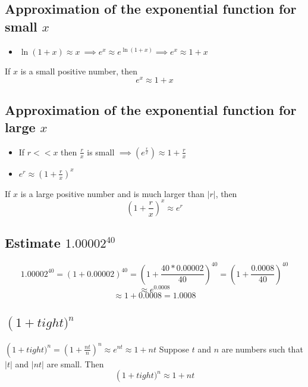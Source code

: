 \subsection{Approximation of the exponential function for small \(x\)}
\begin{itemize}
  \item \(\ln(1+x) \approx x\ \implies e^{x} \approx e^{\ln(1+x)}  \implies e^{x} \approx 1 + x\)
\end{itemize}
If \(x\) is a small positive number, then
\[ e^{x} \approx 1 + x \]

\subsection{Approximation of the exponential function for large \(x\)}
\begin{itemize}
  \item If \(r << x\) then \(\frac{r}{x}\) is small \(\implies \left( e^{\frac{r}{x}}\right) \approx 1 + \frac{r}{x}\)
  \item \(e^{r} \approx \left(1+\frac{r}{x}\right)^{x} \)
\end{itemize}
If \(x\) is a large positive number and is much larger than \(|r|\), then
\[ \left(1+\frac{r}{x}\right)^{x} \approx e^{r} \]

\subsection{Estimate \(1.00002^{40}\)}
\[ 1.00002^{40} = \left(1 + 0.00002\right)^{40} = \left(1 + \frac{40*0.00002}{40} \right)^{40} = \left(1 + \frac{0.0008}{40} \right)^{40} \]\[ \approx e^{0.0008}\]
\[\approx 1 + 0.0008 = 1.0008 \]

\subsection{\( \left( 1 + t
ight)^{n}\)}
\( \left( 1 + t
ight)^{n} = \left(1 + \frac{nt}{n}\right)^{n} \approx e^{nt} \approx  1 + nt  \)
Suppose \(t\) and \(n\) are numbers such that \(|t|\) and \(|nt|\) are small. Then
\[ \left(1+t
ight)^{n} \approx 1 + nt \]

